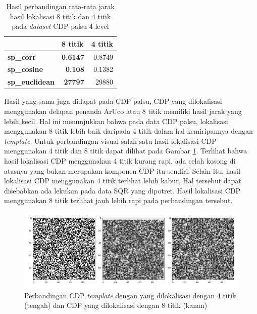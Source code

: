 \begin{table}[!ht]
	\centering
	\caption{Hasil perbandingan rata-rata jarak hasil lokalisasi 8 titik dan 4 titik pada \emph{dataset} CDP palsu 4 level}
	\vspace{0.5em}
	\begin{tabular}{|l|r|r|}
		\hline
		                       & \multicolumn{1}{l|}{\textbf{8 titik}} & \multicolumn{1}{l|}{\textbf{4 titik}} \\ \hline
		\textbf{sp\_corr}      & \textbf{0.6147}                       & 0.8749                                \\ \hline
		\textbf{sp\_cosine}    & \textbf{0.108}                        & 0.1382                                \\ \hline
		\textbf{sp\_euclidean} & \textbf{27797}                        & 29880                                 \\ \hline
	\end{tabular}
	\label{Tab: 4-jaraklokalisasiarucovsnonarucopalsu}
\end{table}

Hasil yang sama juga didapat pada CDP palsu, CDP yang dilokalisasi menggunakan delapan penanda ArUco atau 8 titik memiliki hasil jarak yang lebih kecil. Hal
ini menunjukkan bahwa pada data CDP palsu, lokalisasi menggunakan 8 titik lebih baik daripada 4 titik dalam hal kemiripannya dengan \emph{template}. Untuk
perbandingan visual salah satu hasil lokalisasi CDP menggunakan 4 titik dan 8 titik dapat dilihat pada Gambar \ref{Fig: 4-cdplokalisasi8vs4}. Terlihat bahwa
hasil lokalisasi CDP menggunakan 4 titik kurang rapi, ada celah kosong di atasnya yang bukan merupakan komponen CDP itu sendiri. Selain itu, hasil lokalisasi
CDP menggunakan 4 titik terlihat lebih kabur. Hal tersebut dapat disebabkan ada lekukan pada data SQR yang dipotret. Hasil lokalisasi CDP menggunakan 8
titik terlihat jauh lebih rapi pada perbandingan tersebut.

\begin{figure}[h]
	\centering
	\includegraphics[width=12cm]{contents/chapter-4/4-cdplokalisasi8vs4_2.png}
	\caption{Perbandingan CDP \emph{template} dengan yang dilokalisasi dengan 4 titik (tengah) dan CDP yang dilokalisasi dengan 8 titik (kanan)}
	\label{Fig: 4-cdplokalisasi8vs4}
\end{figure}

